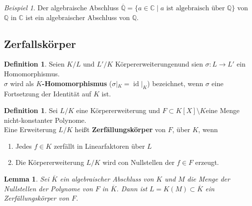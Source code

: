 \documentclass[10pt,a4paper]{article}
\newcommand{\Q}{\ensuremath{\mathbb{Q}}}
\newcommand{\C}{\ensuremath{\mathbb{C}}}
\newcommand{\ol}[1]{\overline{#1}}
\newcommand{\id}{\operatorname{id}}
\theoremstyle{plain}
\newtheorem{lem}[theorem]{Lemma}
\theoremstyle{definition}
\newtheorem{definition}[theorem]{Definition}
\theoremstyle{remark}
\newtheorem{exm}[theorem]{Beispiel}
\begin{document}
 	\begin{exm}
 		Der algebraische Abschluss $\ol{\Q}=\{a\in\C\mid\text{$a$ ist algebraisch über $\Q$}\}$ von $\Q$ in $\C$ ist ein algebraischer Abschluss von $\Q$.
 	\end{exm}


 

\subsection{Zerfallskörper}
	
	\begin{definition}
		Seien $K/L$ und $L'/K$ Körpererweiterungenund sien $\sigma:L\to L'$ ein Homomorphismus.\\
		$\sigma$ wird als \textbf{$K$-Homomorphismus} ($\sigma|_K=\id|_K$) bezeichnet, wenn $\sigma$ eine Fortsetzung der Identität auf $K$ ist.
	\end{definition}

	\begin{definition}
		Sei $L/K$ eine Körpererweiterung und $F\subset K[X]\setminus K$eine Menge nicht-konstanter Polynome.\\
		Eine Erweiterung $L/K$ heißt \textbf{Zerfällungskörper} von $F$, über $K$, wenn
		\begin{enumerate}
			\item Jedes $f\in K$ zerfällt in Linearfaktoren über $L$
			\item Die Körpererweiterung $L/K$ wird con Nullstellen der $f\in F$ erzeugt.
		\end{enumerate}
	\end{definition}

	\begin{lem}
		Sei $\ol K$ ein algebraischer Abschluss von $K$ und $M$ die Menge der Nullstellen der Polynome von $F$ in $\ol K$. Dann ist $L=K(M)\subset \ol K$ ein Zerfällungskörper von $F$.
	\end{lem}
\end{document}
